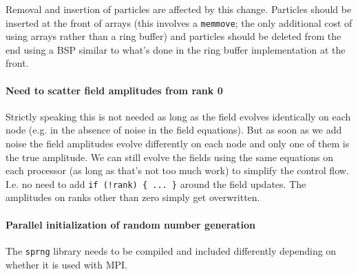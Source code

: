 \documentclass[aps, superscriptaddress, groupedaddress, preprint]{revtex4}
\begin{document}
Removal and insertion of particles are affected by this change.
Particles should be inserted at the front of arrays (this
involves a \verb~memmove~; the only additional cost of using
arrays rather than a ring buffer) and particles should be deleted
from the end using a BSP similar to what's done in the ring
buffer implementation at the front.

\paragraph{Need to scatter field amplitudes from rank 0}
Strictly speaking this is not needed as long as the field evolves
identically on each node (e.g. in the absence of noise in the
field equations).  But as soon as we add noise the field
amplitudes evolve differently on each node and only one of them
is the true amplitude.  We can still evolve the fields using the
same equations on each processor (as long as that's not too much
work) to simplify the control flow.  I.e. no need to add 
\verb~if (!rank) { ... }~ around the field updates.  The
amplitudes on ranks other than zero simply get overwritten.

\paragraph{Parallel initialization of random number generation}
The \verb~sprng~ library needs to be compiled and included
differently depending on whether it is used with MPI.
\end{document}
